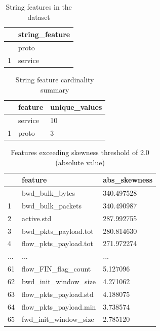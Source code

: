 \documentclass[
  letterpaper,
  DIV=11,
  numbers=noendperiod]{scrartcl}
\begin{document}
\begin{longtable}[]{@{}ll@{}}

\caption{\label{tbl-rtiot-string-features}String features in the
dataset}

\tabularnewline

\toprule\noalign{}
& string\_feature \\
\midrule\noalign{}
\endhead
\bottomrule\noalign{}
\endlastfoot
0 & proto \\
1 & service \\

\end{longtable}

\begin{longtable}[]{@{}lll@{}}

\caption{\label{tbl-rtiot-string-cardinality}String feature cardinality
summary}

\tabularnewline

\toprule\noalign{}
& feature & unique\_values \\
\midrule\noalign{}
\endhead
\bottomrule\noalign{}
\endlastfoot
0 & service & 10 \\
1 & proto & 3 \\

\end{longtable}

\begin{longtable}[]{@{}lll@{}}

\caption{\label{tbl-rtiot-skewness-filtered}Features exceeding skewness
threshold of 2.0 (absolute value)}

\tabularnewline

\toprule\noalign{}
& feature & abs\_skewness \\
\midrule\noalign{}
\endhead
\bottomrule\noalign{}
\endlastfoot
0 & bwd\_bulk\_bytes & 340.497528 \\
1 & bwd\_bulk\_packets & 340.490987 \\
2 & active.std & 287.992755 \\
3 & bwd\_pkts\_payload.tot & 280.814630 \\
4 & flow\_pkts\_payload.tot & 271.972274 \\
... & ... & ... \\
61 & flow\_FIN\_flag\_count & 5.127096 \\
62 & bwd\_init\_window\_size & 4.271062 \\
63 & flow\_pkts\_payload.std & 4.188075 \\
64 & flow\_pkts\_payload.min & 3.738574 \\
65 & fwd\_init\_window\_size & 2.785120 \\

\end{longtable}
\end{document}
